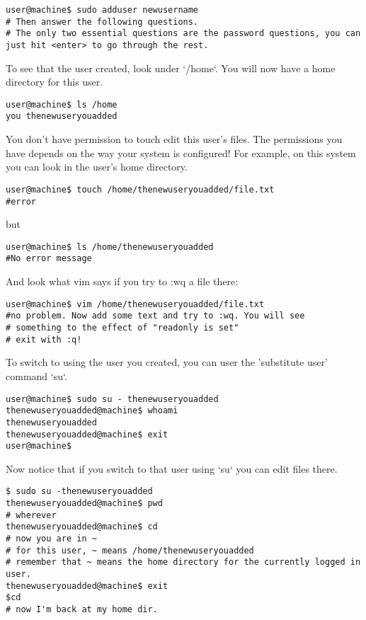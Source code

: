 \documentclass[10pt]{article}
\begin{document}
\begin{lstlisting}[style=term]
user@machine$ sudo adduser newusername
# Then answer the following questions.
# The only two essential questions are the password questions, you can just hit <enter> to go through the rest.
\end{lstlisting}

To see that the user created, look under `/home`. You will now have a home directory for this user.

\begin{lstlisting}[style=term]
user@machine$ ls /home
you thenewuseryouadded
\end{lstlisting}

You don't have permission to touch edit this user's files. The permissions you have depends on the way your system is configured! For example, on
this system you can look in the user's home directory.

\begin{lstlisting}[style=term]
user@machine$ touch /home/thenewuseryouadded/file.txt
#error
\end{lstlisting}


but

\begin{lstlisting}[style=term]
user@machine$ ls /home/thenewuseryouadded
#No error message
\end{lstlisting}

And look what vim says if you try to :wq a file there:

\begin{lstlisting}[style=term]
user@machine$ vim /home/thenewuseryouadded/file.txt
#no problem. Now add some text and try to :wq. You will see
# something to the effect of "readonly is set"
# exit with :q!
\end{lstlisting}

To switch to using the user you created, you can user the 'substitute user' command `su`.

\begin{lstlisting}[style=term]
user@machine$ sudo su - thenewuseryouadded
thenewuseryouadded@machine$ whoami
thenewuseryouadded
thenewuseryouadded@machine$ exit
user@machine$
\end{lstlisting}

Now notice that if you switch to that user using `su` you can edit files there.

\begin{lstlisting}[style=term]
$ sudo su -thenewuseryouadded
thenewuseryouadded@machine$ pwd
# wherever
thenewuseryouadded@machine$ cd
# now you are in ~
# for this user, ~ means /home/thenewuseryouadded
# remember that ~ means the home directory for the currently logged in user.
thenewuseryouadded@machine$ exit
$cd
# now I'm back at my home dir.
\end{lstlisting}
\end{document}
